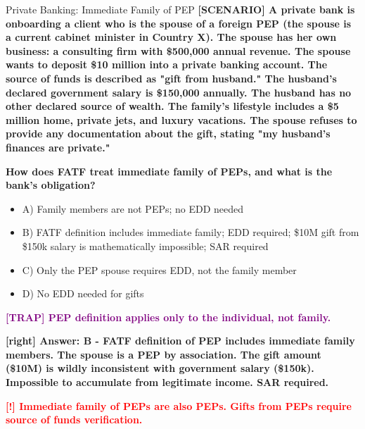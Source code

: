 \documentclass[11pt,a4paper]{beamer}
\newcommand{\redflag}[1]{\textcolor{red}{\textbf{[!] #1}}}
\newcommand{\trap}[1]{\textcolor{purple}{\textbf{[TRAP] #1}}}
\newcommand{\correct}[1]{\textcolor{green!50!black}{\textbf{[right] #1}}}
\newcommand{\scenario}[1]{\textcolor{blue!70!black}{\textbf{[SCENARIO] #1}}}
\begin{document}
	
	\begin{frame}{Private Banking: Immediate Family of PEP}
		\tiny
		\scenario{A private bank is onboarding a client who is the spouse of a foreign PEP (the spouse is a current cabinet minister in Country X). The spouse has her own business: a consulting firm with \$500,000 annual revenue. The spouse wants to deposit \$10 million into a private banking account. The source of funds is described as "gift from husband." The husband's declared government salary is \$150,000 annually. The husband has no other declared source of wealth. The family's lifestyle includes a \$5 million home, private jets, and luxury vacations. The spouse refuses to provide any documentation about the gift, stating "my husband's finances are private."}
		
		\vspace{0.02cm}
		\textbf{How does FATF treat immediate family of PEPs, and what is the bank's obligation?}
		\vspace{0.02cm}
		
		\begin{itemize}
			\item A) Family members are not PEPs; no EDD needed
			\item B) FATF definition includes immediate family; EDD required; \$10M gift from \$150k salary is mathematically impossible; SAR required
			\item C) Only the PEP spouse requires EDD, not the family member
			\item D) No EDD needed for gifts
		\end{itemize}
		
		\vspace{0.02cm}
		\trap{PEP definition applies only to the individual, not family.}
		
		\vspace{0.02cm}
		\correct{Answer: B - FATF definition of PEP includes immediate family members. The spouse is a PEP by association. The gift amount (\$10M) is wildly inconsistent with government salary (\$150k). Impossible to accumulate from legitimate income. SAR required.}
		
		\vspace{0.02cm}
		\redflag{Immediate family of PEPs are also PEPs. Gifts from PEPs require source of funds verification.}
	\end{frame}
	
\end{document}
